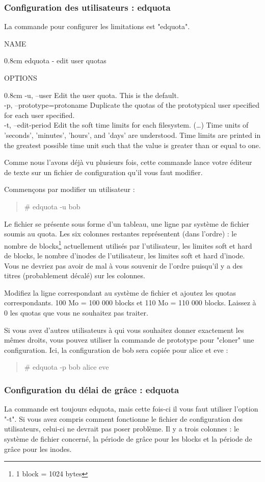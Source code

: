 \documentclass[a4paper,11pt]{article}
\newcommand{\commande}[1] {
    \begin{quote}
    \tt\raggedright #1
    \end{quote}
}
\newcommand{\man}[2]{
    \begin{tcolorbox}[toprule=3mm,width=\textwidth,outer arc=0mm,colbacktitle=grayman,coltitle=black,colback={grayman},colframe={grayman},title={man : \tt #1}]
        \tt\raggedright #2
    \end{tcolorbox}
}
\newcommand{\mandesc}[1]{
    \begin{adjustwidth}{0.8cm}{}
        #1
    \end{adjustwidth}
}
\begin{document}
\subsubsection{Configuration des utilisateurs : edquota}
\par La commande pour configurer les limitations est "edquota".
\man{edquota}{NAME
\mandesc{edquota - edit user quotas}
OPTIONS
\mandesc{-u, --user Edit the user quota. This is the default.\\
-p, --prototype=protoname Duplicate the quotas of the prototypical user specified for each user specified.\\
-t, --edit-period
              Edit  the  soft time limits for each filesystem.  (\dots) Time units of 'seconds', 'minutes', 'hours', and 'days' are understood. Time limits are printed in the greatest possible  time  unit  such that the value is greater than or equal to one.
}}
\par Comme nous l'avons déjà vu plusieurs fois, cette commande lance votre éditeur de texte sur un fichier de configuration qu'il vous faut modifier.
\par Commençons par modifier un utilisateur :
\commande{\# edquota -u bob}
\par Le fichier se présente sous forme d'un tableau, une ligne par système de fichier soumis au quota. Les six colonnes restantes représentent (dans l'ordre) : le nombre de blocks\footnote{1 block = 1024 bytes} actuellement utilisés par l'utilisateur, les limites soft et hard de blocks, le nombre d'inodes de l'utilisateur, les limites soft et hard d'inode. Vous ne devriez pas avoir de mal à vous souvenir de l'ordre puisqu'il y a des titres (probablement décalé) sur les colonnes.
\par Modifiez la ligne correspondant au système de fichier et ajoutez les quotas correspondants. 100 Mo = 100 000 blocks et 110 Mo = 110 000 blocks. Laissez à 0 les quotas que vous ne souhaitez pas traiter.
\par Si vous avez d'autres utilisateurs à qui vous souhaitez donner exactement les mêmes droits, vous pouvez utiliser la commande de prototype pour "cloner" une configuration. Ici, la configuration de bob sera copiée pour alice et eve :
\commande{\# edquota -p bob alice eve}

\subsubsection{Configuration du délai de grâce : edquota}
\par La commande est toujours edquota, mais cette fois-ci il vous faut utiliser l'option "-t". Si vous avez compris comment fonctionne le fichier de configuration des utilisateurs, celui-ci ne devrait pas poser problème. Il y a trois colonnes : le système de fichier concerné, la période de grâce pour les blocks et la période de grâce pour les inodes.
\end{document}
